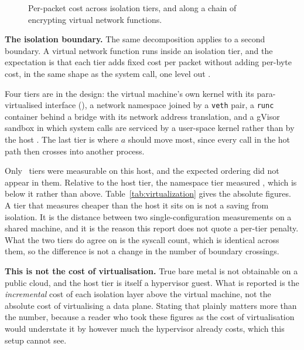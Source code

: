 \begin{figure}[t]
\centering
{}
\caption{Per-packet cost across isolation tiers, and along a chain of encrypting
virtual network functions.}
\label{fig:virtualization}
\end{figure}

\noindent\textbf{The isolation boundary.}
The same decomposition applies to a second boundary. A virtual network function
runs inside an isolation tier, and the expectation is that each tier adds fixed
cost per packet without adding per-byte cost, in the same shape as the system
call, one level out \cite{manousis2020}.

Four tiers are in the design: the virtual machine's own kernel with its
para-virtualised interface (\envNICDriver), a network namespace joined by a
\texttt{veth} pair, a \texttt{runc} container behind a bridge with its network
address translation, and a gVisor sandbox in which system calls are serviced by
a user-space kernel rather than by the host \cite{gvisor}. The last tier is
where $a$ should move most, since every call in the hot path then crosses into
another process.

Only \virtTiers\ tiers were measurable on this host, and the expected ordering
did not appear in them. Relative to the host tier, the namespace tier measured
\virtNetnsRelative, which is below it rather than above.
Table~\ref{tab:virtualization} gives the absolute figures. A tier that measures
cheaper than the host it sits on is not a saving from isolation. It is the
distance between two single-configuration measurements on a shared machine, and
it is the reason this report does not quote a per-tier penalty. What the two
tiers do agree on is the syscall count, which is identical across them, so the
difference is not a change in the number of boundary crossings.

\begin{table}[t]
\caption{Isolation tiers. The relative column is against the host tier, which is
the only comparison that transfers: the absolute cycle count is a property of
this machine.}
\label{tab:virtualization}
\centering\footnotesize

\end{table}

\noindent\textbf{This is not the cost of virtualisation.}
True bare metal is not obtainable on a public cloud, and the host tier is itself
a hypervisor guest. What is reported is the \emph{incremental} cost of each
isolation layer above the virtual machine, not the absolute cost of virtualising
a data plane. Stating that plainly matters more than the number, because a
reader who took these figures as the cost of virtualisation would understate it
by however much the hypervisor already costs, which this setup cannot see.

